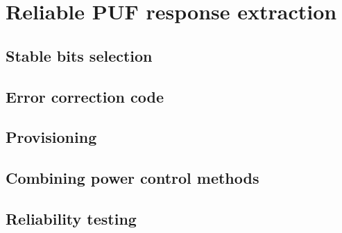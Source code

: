 \chapter{Reliable PUF response extraction} %

\section{Stable bits selection}

\section{Error correction code}\label{sec:ecc}

\section{Provisioning}

\section{Combining power control methods}

\section{Reliability testing}


